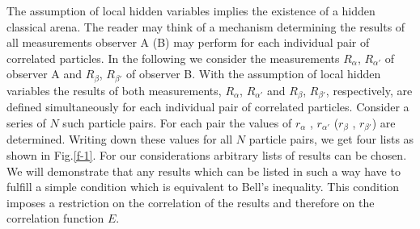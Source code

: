 The assumption of local hidden variables implies the existence of a
hidden classical arena.
The reader may think of a mechanism determining
the results of all measurements
observer A (B) may perform for each individual pair of
correlated particles.
In the following we consider the measurements $R_\alpha$, $R_{\alpha '}$
of observer A and $R_\beta$, $R_{\beta '}$  of observer B.
With the assumption of local hidden variables the results of both
measurements, $R_\alpha$, $R_{\alpha '}$ and $R_\beta$, $R_{\beta '}$,
respectively, are defined simultaneously for each individual pair of
correlated particles.
Consider a series of $N$ such particle pairs.
For each pair the values of
$r_\alpha$ ,
$r_{\alpha '}$
($r_\beta$ ,
$r_{\beta '}$) are determined.
Writing down these values for all $N$ particle pairs, we get four lists as
shown in Fig.\ref{f-1}. For our considerations arbitrary lists of
results can be chosen.
We will demonstrate that any results which can be listed in
such a way have to fulfill a simple condition which is equivalent to
Bell\rq s inequality. This condition imposes a restriction on the
correlation of the results and therefore on the correlation function $E$.

